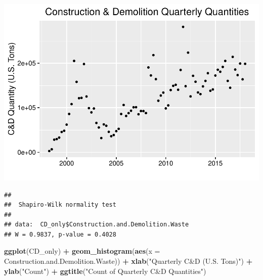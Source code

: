 \documentclass[12pt,]{article}
\newenvironment{Shaded}{\begin{snugshade}}{\end{snugshade}}
\newcommand{\KeywordTok}[1]{\textcolor[rgb]{0.13,0.29,0.53}{\textbf{#1}}}
\newcommand{\DataTypeTok}[1]{\textcolor[rgb]{0.13,0.29,0.53}{#1}}
\newcommand{\StringTok}[1]{\textcolor[rgb]{0.31,0.60,0.02}{#1}}
\newcommand{\CommentTok}[1]{\textcolor[rgb]{0.56,0.35,0.01}{\textit{#1}}}
\newcommand{\OperatorTok}[1]{\textcolor[rgb]{0.81,0.36,0.00}{\textbf{#1}}}
\newcommand{\NormalTok}[1]{#1}
\begin{document}
\includegraphics{SKo_Project_Template_files/figure-latex/Test3-1.pdf}

\begin{Shaded}
\end{Shaded}

\begin{verbatim}
## 
##  Shapiro-Wilk normality test
## 
## data:  CD_only$Construction.and.Demolition.Waste
## W = 0.9837, p-value = 0.4028
\end{verbatim}

\begin{Shaded}
\begin{Highlighting}[]
\KeywordTok{ggplot}\NormalTok{(CD_only) }\OperatorTok{+}
\StringTok{  }\KeywordTok{geom_histogram}\NormalTok{(}\KeywordTok{aes}\NormalTok{(}\DataTypeTok{x =}\NormalTok{ Construction.and.Demolition.Waste)) }\OperatorTok{+}\StringTok{ }
\StringTok{  }\KeywordTok{xlab}\NormalTok{(}\StringTok{"Quarterly C&D (U.S. Tons)"}\NormalTok{) }\OperatorTok{+}
\StringTok{  }\KeywordTok{ylab}\NormalTok{(}\StringTok{"Count"}\NormalTok{) }\OperatorTok{+}\StringTok{ }
\StringTok{  }\KeywordTok{ggtitle}\NormalTok{(}\StringTok{"Count of Quarterly C&D Quantities"}\NormalTok{)}
\end{Highlighting}
\end{Shaded}
\end{document}
